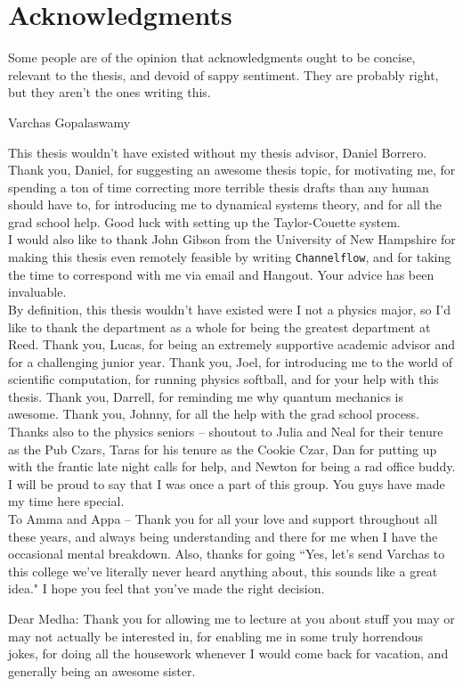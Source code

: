     \chapter*{Acknowledgments}
	\epigraph{Some people are of the opinion that acknowledgments ought to be concise, relevant to the thesis, and devoid of sappy sentiment. They are probably right, but they aren't the ones writing this.}{Varchas Gopalaswamy}

This thesis wouldn't have existed without my thesis advisor, Daniel Borrero. Thank you, Daniel, for suggesting an awesome thesis topic, for motivating me, for spending a ton of time correcting more terrible thesis drafts than any human should have to, for introducing me to dynamical systems theory, and for all the grad school help. Good luck with setting up the Taylor-Couette system.\\

I would also like to thank John Gibson from the University of New Hampshire for making this thesis even remotely feasible by writing {\tt Channelflow}, and for taking the time to correspond with me via email and Hangout. Your advice has been invaluable. \\
 
By definition, this thesis wouldn't have existed were I not a physics major, so I'd like to thank the department as a whole for being the greatest department at Reed. Thank you, Lucas, for being an extremely supportive academic advisor and for a  challenging junior year. Thank you, Joel, for introducing me to the world of scientific computation, for running physics softball, and for your help with this thesis. Thank you, Darrell, for reminding me why quantum mechanics is awesome. Thank you, Johnny, for all the help with the grad school process. Thanks also to the physics seniors -- shoutout to Julia and Neal for their tenure as the Pub Czars, Taras for his tenure as the Cookie Czar, Dan for putting up with the frantic late night calls for help, and Newton for being a rad office buddy.  I will be proud to say that I was once a part of this group. You guys have made my time here special. \\

To Amma and Appa -- Thank you for all your love and support throughout all these years, and always being understanding and there for me when I have the occasional mental breakdown. Also, thanks for going ``Yes, let's send Varchas to this college we've literally never heard anything about, this sounds like a great idea." I hope you feel that you've made the right decision. 

Dear Medha: Thank you for allowing me to lecture at you about stuff you may or may not actually be interested in, for enabling me in some truly horrendous jokes, for doing all the housework whenever I would come back for vacation, and generally being an awesome sister. \\






